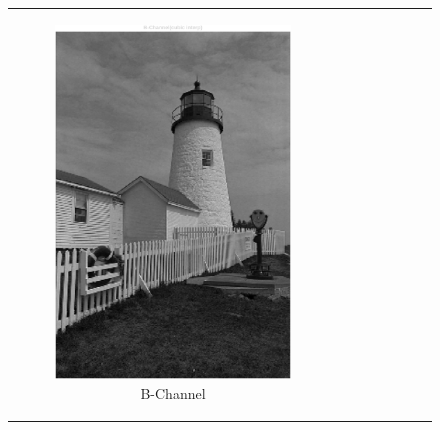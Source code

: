 \documentclass[11pt, a4]{article}
\begin{document}
\begin{enumerate}
\begin{enumerate}
\begin{figure}[H]
{\begin{tabular}{cc}
\begin{subfigure}[h]{0.45\linewidth}
						\includegraphics[width=\linewidth]{../output/2_B-channel_cubic.pdf}
						\caption{B-Channel}
						\label{fig:problem1_part2_B_cubic}
					\end{subfigure} &
					\begin{subfigure}[h]{0.45\linewidth}
						\centering

\end{subfigure}
\end{tabular}}
\end{figure}
\end{enumerate}
\end{enumerate}
\end{document}
